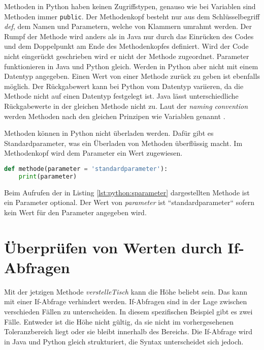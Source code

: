 Methoden in Python haben keinen Zugriffstypen, genauso wie bei Variablen sind Methoden immer \texttt{public}. Der Methodenkopf besteht nur aus dem Schlüsselbegriff \textit{def}, dem Namen und Parametern, welche von Klammern umrahmt werden. Der Rumpf der Methode wird anders als in Java nur durch das Einrücken des Codes und dem Doppelpunkt am Ende des Methodenkopfes definiert. Wird der Code nicht eingerückt geschrieben wird er nicht der Methode zugeordnet. Parameter funktionieren in Java und Python gleich. Werden in Python aber nicht mit einem Datentyp angegeben. Einen Wert von einer Methode zurück zu geben ist ebenfalls möglich. Der Rückgabewert kann bei Python vom Datentyp variieren, da die Methode nicht auf einen Datentyp festgelegt ist. Java lässt unterschiedliche Rückgabewerte in der gleichen Methode nicht zu. Laut der \textit{naming convention} werden Methoden nach den gleichen Prinzipen wie Variablen genannt \cite{Ims:h-s}\cite{Microsoft:CapCon}. \cite{Python3:Buch}\cite{Louis:2010}
\par
Methoden können in Python nicht überladen werden. Dafür gibt es Standardparameter, was ein Überladen von Methoden überflüssig macht. Im Methodenkopf wird dem Parameter ein Wert zugewiesen.

\begin{lstlisting}[language=python,caption={Methode in Python mit Standartparameter},captionpos=b,label={lst:python:sparameter},frame=none]
def methode(parameter = 'standardparameter'):
    print(parameter)
\end{lstlisting}

Beim Aufrufen der in Listing \ref{lst:python:sparameter} dargestellten Methode ist ein Parameter optional. Der Wert von \textit{parameter} ist “standardparameter“ sofern kein Wert für den Parameter angegeben wird.\par
\section{Überprüfen von Werten durch If-Abfragen}
Mit der jetzigen Methode \textit{verstelleTisch} kann die Höhe beliebt sein. Das kann mit einer If-Abfrage verhindert werden. If-Abfragen sind in der Lage zwischen verschieden Fällen zu unterscheiden. In diesem spezifischen Beispiel gibt es zwei Fälle. Entweder ist die Höhe nicht gültig, da sie nicht im vorhergesehenen Toleranzbereich liegt oder sie bleibt innerhalb des Bereichs. Die If-Abfrage wird in Java und Python gleich strukturiert, die Syntax unterscheidet sich jedoch. \cite{Python3:Buch}\cite{Louis:2010}

